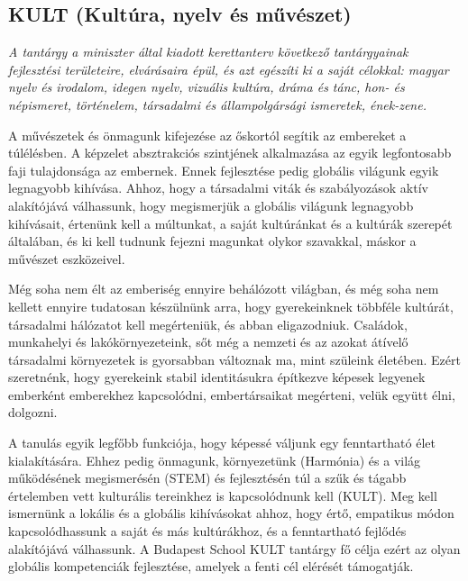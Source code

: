 \subsection[KULT]{KULT (Kultúra, nyelv és művészet)}
\emph{A tantárgy a miniszter által kiadott kerettanterv következő tantárgyainak
  fejlesztési területeire, elvárásaira épül, és azt egészíti ki a saját célokkal: magyar nyelv és irodalom, idegen
  nyelv, vizuális kultúra, dráma és tánc, hon- és népismeret, történelem,
  társadalmi és állampolgársági ismeretek, ének-zene.}

A művészetek és önmagunk kifejezése az őskortól segítik az embereket a
túlélésben. A képzelet absztrakciós szintjének alkalmazása az egyik
legfontosabb faji tulajdonsága az embernek. Ennek fejlesztése pedig globális
világunk egyik legnagyobb kihívása. Ahhoz, hogy a társadalmi viták és
szabályozások aktív alakítójává válhassunk, hogy megismerjük a globális
világunk legnagyobb kihívásait, értenünk kell a múltunkat, a saját kultúránkat
és a kultúrák szerepét általában, és ki kell tudnunk fejezni magunkat olykor
szavakkal, máskor a művészet eszközeivel.

Még soha nem élt az emberiség ennyire behálózott világban, és még soha nem
kellett ennyire tudatosan készülnünk arra, hogy gyerekeinknek többféle
kultúrát, társadalmi hálózatot kell megérteniük, és abban eligazodniuk.
Családok, munkahelyi és lakókörnyezeteink, sőt még a nemzeti és az azokat
átívelő társadalmi környezetek is gyorsabban változnak ma, mint szüleink
életében. Ezért szeretnénk, hogy gyerekeink stabil identitásukra építkezve
képesek legyenek emberként emberekhez kapcsolódni, embertársaikat megérteni,
velük együtt élni, dolgozni.

A tanulás egyik legfőbb funkciója, hogy képessé váljunk egy fenntartható élet
kialakítására. Ehhez pedig önmagunk, környezetünk (Harmónia) és a világ
működésének megismerésén (STEM) és fejlesztésén túl a szűk és tágabb értelemben
vett kulturális tereinkhez is kapcsolódnunk kell (KULT). Meg kell ismernünk a
lokális és a globális kihívásokat ahhoz, hogy értő, empatikus módon
kapcsolódhassunk a saját és más kultúrákhoz, és a fenntartható fejlődés
alakítójává válhassunk. A Budapest School KULT tantárgy fő célja ezért az olyan
globális kompetenciák fejlesztése, amelyek a fenti cél elérését támogatják.

